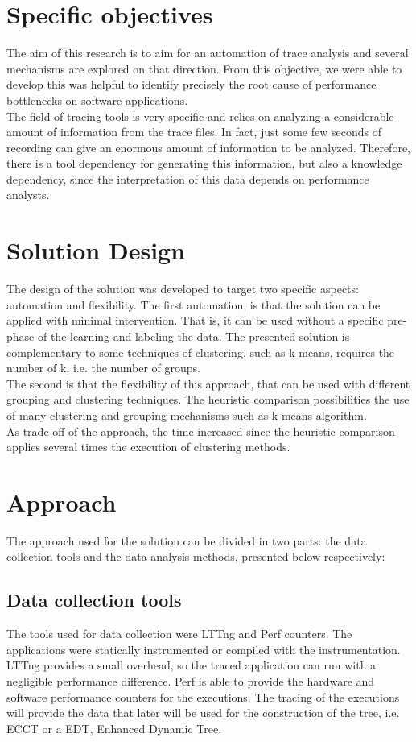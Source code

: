 \section{Specific objectives}
The aim of this research is to aim for an automation of trace analysis and several mechanisms are explored on that direction. From this objective, we were able to develop this was helpful to identify precisely the root cause of performance bottlenecks on software applications.\\
The field of tracing tools is very specific and relies on analyzing a considerable amount of information from the trace files. In fact, just some few seconds of recording can give an enormous amount of information to be analyzed. Therefore, there is a tool dependency for generating this information, but also a knowledge dependency, since the interpretation of this data depends on performance analysts.  

\section{Solution Design}
The design of the solution was developed to target two specific aspects: automation and flexibility. 
The first automation, is that the solution can be applied with minimal intervention. That is, it can be used without a specific pre-phase of the learning and labeling the data. The presented solution is complementary to some techniques of clustering, such as k-means, requires the number of k, i.e. the number of groups.\\
The second is that the flexibility of this approach, that can be used with different grouping and clustering techniques. The heuristic comparison possibilities the use of many clustering and grouping mechanisms such as k-means algorithm.\\
As trade-off of the approach, the time increased since the heuristic comparison applies several times the execution of clustering methods.
\section{Approach}
The approach used for the solution can be divided in two parts: the data collection tools and the data analysis methods, presented below respectively:
\subsection{Data collection tools}
The tools used for data collection were LTTng and Perf counters. The applications were statically instrumented or compiled with the instrumentation. LTTng provides a small overhead, so the traced application can run with a negligible performance difference. Perf is able to provide the hardware and software performance counters for the executions.
The tracing of the executions will provide the data that later will be used for the construction of the tree, i.e. ECCT or a EDT, Enhanced Dynamic Tree.
